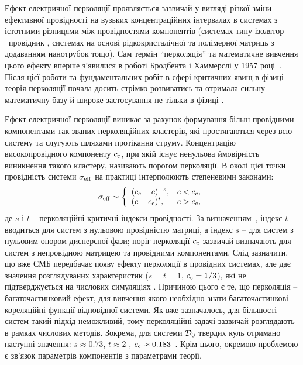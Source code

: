 \documentclass[14pt,twoside]{vakthesis}
\begin{document}
Ефект електричної перколяції проявляється зазвичай у вигляді різкої зміни ефективної провідності на вузьких концентраційних інтервалах в системах з істотними різницями між провідностями компонентів (системах типу ізолятор~-~провідник \cite{Grannan1981,ChenI.-G.1986}, системах на основі рідкокристалічної \cite{Tomylko2015, Lebovka2017} та полімерної \cite{Lebovka2011, Lysenkov2012, Klepko2015} матриць з додаванням нанотрубок тощо). 
Сам термін ``перколяція'' та математичне вивчення цього ефекту вперше з'явилися в роботі Бродбента і Хаммерслі у 1957 році~\cite{Broad57}. Після цієї роботи та фундаментальних робіт в сфері критичних явищ в фізиці теорія перколяції почала досить стрімко розвиватись та отримала сильну математичну базу \cite{BergmanB, Kirkpatrick1973, Aharony, Bollobas, Meester, Sahimi, Hunt} й широке застосування не тільки в фізиці \cite{Aharony,Sahimi2}. 

Ефект електричної перколяції виникає за рахунок формування більш провідними компонентами так званих перколяційних кластерів, які простягаються через всю систему та слугують шляхами протікання струму.
Концентрацію високопровідного компоненту $c_{\rm c}$, при якій існує ненульова ймовірність виникнення такого кластеру, називають порогом перколяції. В околі цієї точки провідність системи $\sigma_{\rm eff}$ на практиці інтерполюють степеневими законами:
\begin{equation}\label{eq:perc-indexes-s-t}
\sigma_{\rm eff} \sim \left\{ 
\begin{array}{ll}
(c_{\rm c} - c)^{-s}, & c< c_{\rm c},\\
(c - c_{\rm c})^t, & c> c_{\rm c},
\end{array}
\right.
\end{equation}
де $s$ і $t$ -- перколяційні критичні індекси провідності. За визначенням~\cite{Aharony,Torquato,Sahimi,Hunt}, індекс $t$ вводиться для систем з нульовою провідністю матриці, а індекс $s$ -- для систем з нульовим опором дисперсної фази; поріг перколяції $c_{\rm c}$ зазвичай визначають для систем з непровідною матрицею та провідними компонентами. Слід зазначити, що вже СМБ передбачає появу ефекту перколяції в провідних системах, але дає  значення розглядуваних характеристик ($s=t=1$, $c_{\rm c}=1/3$), які не підтверджується на числових симуляціях \cite{Kirkpatrick1973,Torquato,Aharony}. Причиною цього є те, що перколяція -- багаточастинковий ефект, для вивчення якого необхідно знати багаточастинкові кореляційні функції відповідної системи. Як вже зазначалось, для більшості систем такий підхід неможливий, тому перколяційні задачі зазвичай розглядають в рамках числових методів. Зокрема, для системи ${\cal D}_0$ твердих куль отримано наступні значення: $s\approx 0.73$, $t\approx 2$ \cite{Aharony}, $c_{\rm c} \approx 0.183$~\cite{Powel1979}.
Крім цього, окремою проблемою є зв'язок параметрів компонентів з параметрами теорії.
\end{document}
